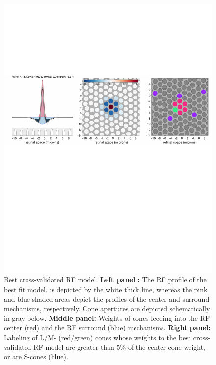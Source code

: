 \documentclass[11pt, oneside]{article}   	%
\begin{document}
\begin{figure}[htbp] %
   \centering
   \includegraphics[width=6in]{Figures/CrossValidationMethod_BestCrossValidatedModel.pdf} 
   \caption{Best cross-validated RF model. \textbf{Left panel :} The RF profile of the best fit model, is depicted by the white thick line, whereas the pink and blue shaded areas depict the profiles of the center and surround mechanisms, respectively. Cone apertures are depicted schematically in gray below.  \textbf{Middle panel:} Weights of cones feeding into the RF center (red) and the RF surround (blue) mechanisms. \textbf{Right panel:} Labeling of L/M- (red/green) cones whose weights to the best cross-validated RF model are greater than 5\% of the center cone weight, or are S-cones (blue).
   }
 \label{fig:CrossValidationApproach_BestCrossValidatedModel}
\end{figure}

\newpage
\newpage
\end{document}

